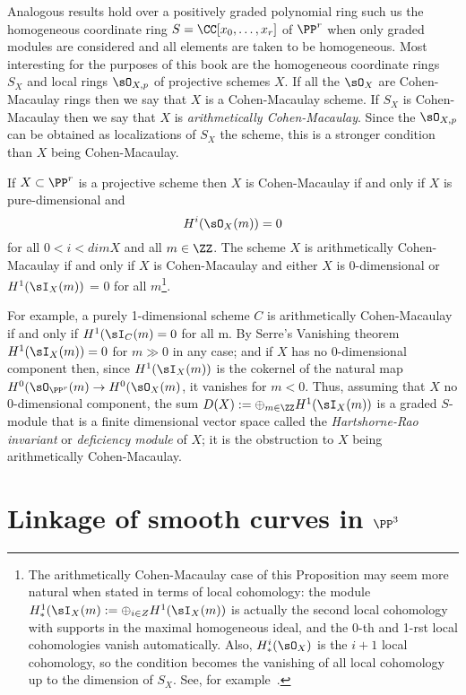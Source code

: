 Analogous results hold over a positively graded polynomial ring such us the homogeneous coordinate ring $S = \CC[x_0,\dots,x_r]$ of $\PP^r$ when
only graded modules are considered and all elements are taken to be homogeneous. Most interesting for the purposes of this book are the
homogeneous coordinate rings $S_X$ and local rings $\sO_{X,p}$ of projective schemes $X$. If all the $\sO_X$ are Cohen-Macaulay rings then we say that
$X$ is a Cohen-Macaulay scheme. If $S_X$ is Cohen-Macaulay then we say that $X$ is \emph{arithmetically Cohen-Macaulay}. Since the $\sO_{X,p}$ can be obtained as localizations of $S_X$ the scheme, this is a stronger condition than $X$ being Cohen-Macaulay.

\begin{proposition}
If $X\subset \PP^r$ is a projective scheme then $X$ is Cohen-Macaulay if and only if 
$X$ is pure-dimensional and
$$
H^i(\sO_X(m))= 0
$$
for all $0<i<dim X$ and all $m\in \ZZ$. The scheme
 $X$ is arithmetically Cohen-Macaulay if and only if $X$ is Cohen-Macaulay and either $X$ is 0-dimensional or
$H^1(\sI_X(m))$ = 0 for all $m$\footnote{The arithmetically Cohen-Macaulay case of this Proposition may seem more natural when stated in terms of local cohomology:
the module $H^1_*(\sI_X(m) := \oplus_{i\in Z} H^1(\sI_X(m))$ is actually the second local cohomology with supports in the maximal homogeneous ideal,
and the 0-th and 1-rst local cohomologies vanish automatically. Also, $H^i_*(\sO_X)$ is the $i+1$ local cohomology, so the condition
becomes the vanishing of all local cohomology up to the dimension of $S_X$. See, for example~\cite[Appendix 1]{MR2103875}.}.
\end{proposition}



For example, a purely 1-dimensional scheme $C$  is arithmetically Cohen-Macaulay if and only if $H^1(\sI_C(m) = 0$
for all m.
By Serre's Vanishing theorem $H^1(\sI_X(m)) = 0$ for $m\gg 0$ in any case; and if $X$ has
no 0-dimensional component then, since $H^1(\sI_X(m))$ is the cokernel of the natural map $H^0(\sO_{\PP^r}(m) \to H^0(\sO_{X}(m)$,
it vanishes for $m<0$. Thus, assuming that  $X$
no 0-dimensional component, the sum $D(X) := \oplus_{m\in \ZZ} H^1(\sI_X(m))$ is a graded $S$-module that
is a finite dimensional vector space called the \emph{Hartshorne-Rao invariant} or \emph{deficiency module} of $X$;
it is the obstruction to $X$ being arithmetically Cohen-Macaulay.


\section{Linkage of smooth curves in $\PP^3$}\label{SLinkage}\label{linkage section}


